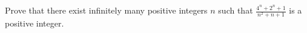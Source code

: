 Prove that there exist infinitely many positive integers $n$ such that $\frac{4^n+2^n+1}{n^2+n+1}$ is a positive integer.
